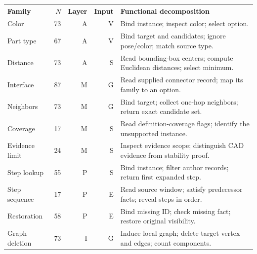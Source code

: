 \begin{tabularx}{\textwidth}{lrrrX}
\toprule
Family & $N$ & Layer & Input & Functional decomposition\\\midrule
Color & 73 & A & V & Bind instance; inspect color; select option.\\
Part type & 67 & A & V & Bind target and candidates; ignore pose/color; match source type.\\
Distance & 73 & A & S & Read bounding-box centers; compute Euclidean distances; select minimum.\\
Interface & 87 & M & G & Read supplied connector record; map its family to an option.\\
Neighbors & 73 & M & G & Bind target; collect one-hop neighbors; return exact candidate set.\\
Coverage & 17 & M & S & Read definition-coverage flags; identify the unsupported instance.\\
Evidence limit & 24 & M & S & Inspect evidence scope; distinguish CAD evidence from stability proof.\\
Step lookup & 55 & P & S & Bind instance; filter author records; return first expanded step.\\
Step sequence & 17 & P & E & Read source window; satisfy predecessor facts; reveal steps in order.\\
Restoration & 58 & P & E & Bind missing ID; check missing fact; restore original visibility.\\
Graph deletion & 73 & I & G & Induce local graph; delete target vertex and edges; count components.\\
\bottomrule
\end{tabularx}
